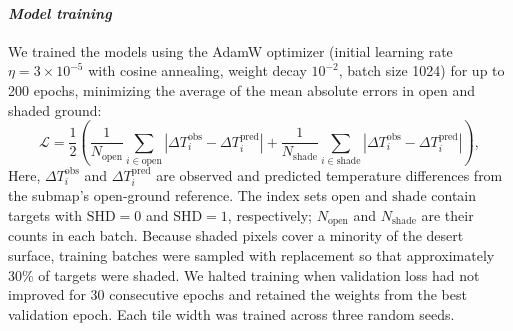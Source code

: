 \documentclass[12pt]{article}
\begin{document}
\paragraph*{\textit{Model training}}
We trained the models using the AdamW optimizer (initial learning rate $\eta = 3 \times 10^{-5}$ with cosine annealing, weight decay $10^{-2}$, batch size 1024) for up to 200 epochs, minimizing the average of the mean absolute errors in open and shaded ground:
\begin{equation} 
\mathcal{L} = \frac{1}{2}\left(\frac{1}{N_\text{open}}\sum_{i \in \text{open}} \left|\Delta T_{i}^\text{obs} - \Delta T_{i}^\text{pred}\right| + \frac{1}{N_\text{shade}}\sum_{i \in \text{shade}} \left|\Delta T_{i}^\text{obs} - \Delta T_{i}^\text{pred}\right|\right),
\end{equation}
Here, $\Delta T_i^\text{obs}$ and $\Delta T_i^\text{pred}$ are observed and predicted temperature differences from the submap's open-ground reference. The index sets $\text{open}$ and $\text{shade}$ contain targets with $\text{SHD}=0$ and $\text{SHD}=1$, respectively; $N_\text{open}$ and $N_\text{shade}$ are their counts in each batch. Because shaded pixels cover a minority of the desert surface, training batches were sampled with replacement so that approximately 30\% of targets were shaded. We halted training when validation loss had not improved for 30 consecutive epochs and retained the weights from the best validation epoch. Each tile width was trained across three random seeds.
\end{document}

